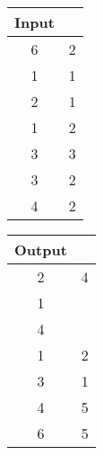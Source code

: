 \documentclass[11pt, a4paper, twoside]{article}
\begin{document}
\begin{itemize}
\begin{itemize}
					\begin{minipage}{0.2\textwidth}
						\begin{tabular}{cc}
						   Input \\
						   \hline
						   6 & 2 \\
						   1 & 1 \\
						   2 & 1 \\
						   1 & 2 \\
						   3 & 3 \\
						   3 & 2 \\
						   4 & 2 \\
						\end{tabular}
					\end{minipage} 
					\begin{minipage}{0.2\textwidth}
						\begin{tabular}{cc}
						   Output \\
						   \hline
						   2 & 4 \\
						   1 &  \\
						   4 &  \\
						   1 & 2 \\
						   3 & 1 \\
						   4 & 5 \\
						   6 & 5 \\
						\end{tabular}
					\end{minipage} 
					
			\end{itemize}
		

\end{itemize}
\end{document}
